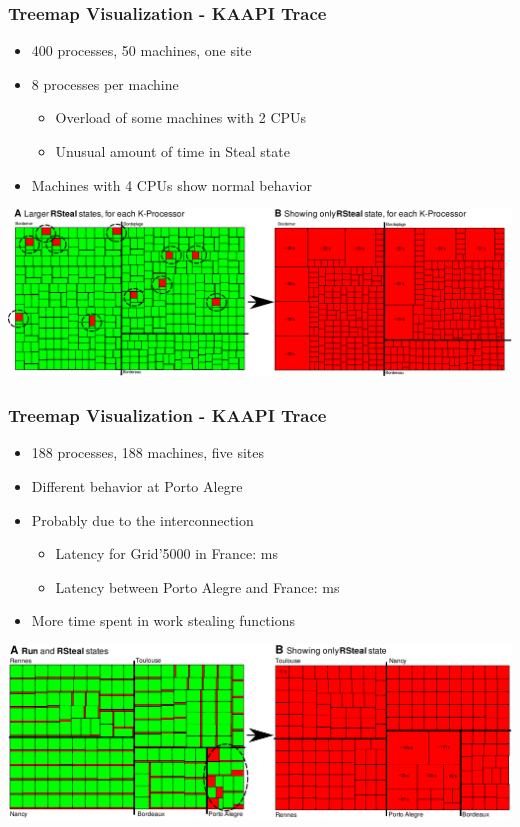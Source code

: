 \frame
{
   \frametitle{Treemap Visualization - KAAPI Trace}

   \begin{itemize}
   \item 400 processes, 50 machines, one site
   \item 8 processes per machine
      \begin{itemize}
      \item Overload of some machines with 2 CPUs
      \item Unusual amount of time in Steal state
      \end{itemize}
   \item Machines with 4 CPUs show normal behavior
   \end{itemize}

   \vfill
   \includegraphics[width=\textwidth]{img/kaapi-scenario-b.pdf}
}

\frame
{
   \frametitle{Treemap Visualization - KAAPI Trace}

   \begin{itemize}
   \item 188 processes, 188 machines, five sites
   \item Different behavior at Porto Alegre
   \item Probably due to the interconnection
      \begin{itemize}
      \item Latency for Grid'5000 in France:  ms
      \item Latency between Porto Alegre and France:  ms
      \end{itemize}
   \item More time spent in work stealing functions
   \end{itemize}

   \vfill
   \includegraphics[width=\textwidth]{img/kaapi-scenario-d.pdf}
}

